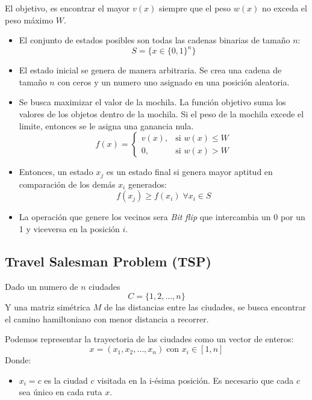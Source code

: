 \documentclass[12pt,twoside]{article}
\begin{document}
	El objetivo, es encontrar el mayor $v(x)$ siempre que el peso $w(x)$ no exceda el peso máximo $W$. 
	
	\begin{itemize}
		\item El conjunto de estados posibles son todas las cadenas binarias de tamaño $n$: \[ S = \{ x \in \{ 0, 1  \}^n \} \]
		
		\item El estado inicial se genera de manera arbitraria. Se crea una cadena de tamaño $n$ con ceros y un numero uno asignado en una posición aleatoria.
		
		\item Se busca maximizar el valor de la mochila. La función objetivo suma los valores de los objetos dentro de la mochila. Si el peso de la mochila excede el limite, entonces se le asigna una ganancia nula.
		\[
		f(x) =
		\begin{cases} 
			v(x), & \text{si } w(x) \leq W \\ 
			0, & \text{si } w(x) > W
		\end{cases}
		\]
		
		\item Entonces, un estado $x_j$ es un estado final si genera mayor aptitud en comparación de los demás $x_i$ generados: \[f(x_j) \geq f(x_i) \; \forall x_i \in S\]
		
		\item La operación que genere los vecinos sera \textit{Bit flip} que intercambia un 0 por un 1 y viceversa en la posición $i$.
		
	\end{itemize}
	
	\subsection{Travel Salesman Problem (TSP)}
	
	Dado un numero de $n$ ciudades \[ C = \{1,2, \dots , n\} \] Y una matriz simétrica $M$ de las distancias entre las ciudades, se busca encontrar el camino hamiltoniano con menor distancia a recorrer.
	
	Podemos representar la trayectoria de las ciudades como un vector de enteros:
	\[ x = (x_1, x_2, \dots, x_n) \; \text{con } x_i \in [1, n] \]
	Donde:
	\begin{itemize}
		\item $x_i = c$ es la ciudad $c$ visitada en la i-ésima posición. Es necesario que cada $c$ sea único en cada ruta $x$.
	\end{itemize}
	
\end{document}
